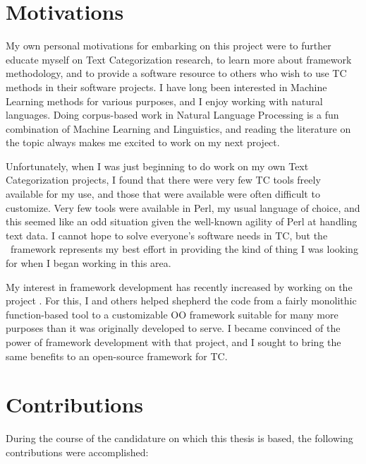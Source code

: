 \section*{Motivations}

My own personal motivations for embarking on this project were to
further educate myself on Text Categorization research, to learn more
about framework methodology, and to provide a software resource to
others who wish to use TC methods in their software projects.  I have
long been interested in Machine Learning methods for various purposes,
and I enjoy working with natural languages.  Doing corpus-based work
in Natural Language Processing is a fun combination of Machine
Learning and Linguistics, and reading the literature on the topic
always makes me excited to work on my next project.

Unfortunately, when I was just beginning to do work on my own Text
Categorization projects, I found that there were very few TC tools
freely available for my use, and those that were available were often
difficult to customize.  Very few tools were available in Perl, my
usual language of choice, and this seemed like an odd situation given
the well-known agility of Perl at handling text data.  I cannot hope
to solve everyone's software needs in TC, but the \aicat\ framework
represents my best effort in providing the kind of thing I was looking
for when I began working in this area.

My interest in framework development has recently increased by working
on the  project \cite{rolsky:02}.  For this, I
and others helped shepherd the code from a fairly monolithic
function-based tool to a customizable OO framework suitable for many
more purposes than it was originally developed to serve.  I became
convinced of the power of framework development with that project, and
I sought to bring the same benefits to an open-source framework for TC.


\section*{Contributions}

During the course of the candidature on which this thesis is based,
the following contributions were accomplished:

